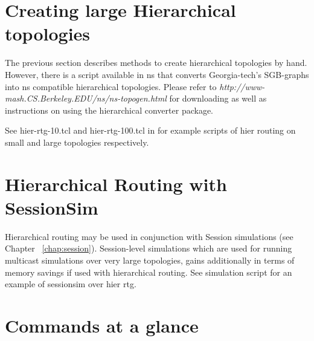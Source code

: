 \section{Creating large Hierarchical topologies}
\label{large-hier-topo}
The previous section describes methods to create hierarchical topologies
by hand. However, there is a script available in ns that converts
Georgia-tech's SGB-graphs into ns compatible hierarchical topologies.
Please refer to {\em http://www-mash.CS.Berkeley.EDU/ns/ns-topogen.html}
for downloading as well as instructions on using the hierarchical
converter package. 

See hier-rtg-10.tcl and hier-rtg-100.tcl in  for example
scripts of hier routing on small and large topologies
respectively. 


\section{Hierarchical Routing with SessionSim}
\label{sec:hier-rtg-with-sessionsim}

Hierarchical routing may be used in conjunction with Session simulations
(see Chapter ~\ref{chap:session}). Session-level simulations which are used
for running multicast simulations over very large topologies, gains
additionally in terms of memory savings if used with hierarchical
routing. See simulation script 
for an example of sessionsim over hier rtg.


\section{Commands at a glance}

